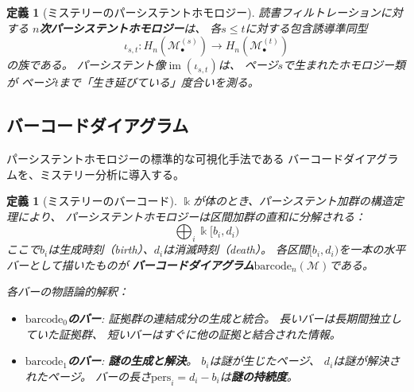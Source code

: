 \documentclass[12pt,twocolumn]{ltjsarticle}
\newtheorem{definition}[theorem]{定義}
\newcommand{\im}{\operatorname{im}}
\newcommand{\Mys}{\mathcal{M}}
\newcommand{\kk}{\Bbbk}
\newcommand{\pers}{\mathrm{pers}}
\newcommand{\barcode}{\mathrm{barcode}}
\begin{document}
\begin{definition}[ミステリーのパーシステントホモロジー]
\label{def:persistent_homology}
読書フィルトレーションに対する
\textbf{$n$次パーシステントホモロジー}は、
各$s \leq t$に対する包含誘導準同型
\begin{equation}
\iota_{s,t}: H_n(\Mys_\bullet^{(s)}) \to H_n(\Mys_\bullet^{(t)})
\end{equation}
の族である。
パーシステント像$\im(\iota_{s,t})$は、
ページ$s$で生まれたホモロジー類が
ページ$t$まで「生き延びている」度合いを測る。
\end{definition}

\subsection{バーコードダイアグラム}

パーシステントホモロジーの標準的な可視化手法である
バーコードダイアグラムを、ミステリー分析に導入する。

\begin{definition}[ミステリーのバーコード]
\label{def:barcode}
$\kk$が体のとき、パーシステント加群の構造定理により、
パーシステントホモロジーは区間加群の直和に分解される：
\begin{equation}
\bigoplus_i \kk[b_i, d_i)
\end{equation}
ここで$b_i$は生成時刻（birth）、$d_i$は消滅時刻（death）。
各区間$[b_i, d_i)$を一本の水平バーとして描いたものが
\textbf{バーコードダイアグラム}$\barcode_n(\Mys)$である。

各バーの物語論的解釈：
\begin{itemize}
\item \textbf{$\barcode_0$のバー}: 証拠群の連結成分の生成と統合。
長いバーは長期間独立していた証拠群、
短いバーはすぐに他の証拠と結合された情報。

\item \textbf{$\barcode_1$のバー}: \textbf{謎の生成と解決}。
$b_i$は謎が生じたページ、
$d_i$は謎が解決されたページ。
バーの長さ$\pers_i = d_i - b_i$は\textbf{謎の持続度}。
\end{itemize}
\end{definition}
\end{document}
